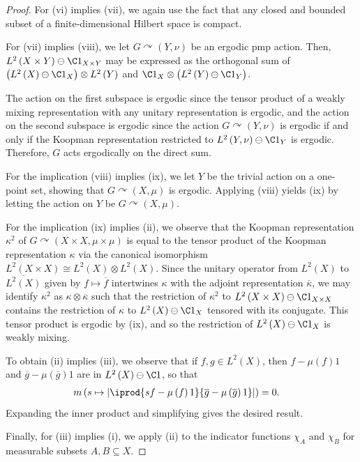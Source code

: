 \documentclass[10pt]{mypackage}
\begin{document}
\begin{proof}
  For (vi) implies (vii), we again use the fact that any closed and bounded subset of a finite-dimensional Hilbert space is compact.

  For (vii) implies (viii), we let $G\curvearrowright \left( Y,\nu \right)$ be an ergodic pmp action. Then, $L^2\left( X\times Y \right)\ominus \C 1_{X\times Y}$ may be expressed as the orthogonal sum of $\left( L^2\left( X \right)\ominus \C 1_X \right)\otimes L^2\left( Y \right)$ and $\C 1_X\otimes \left( L^2\left( Y \right)\ominus \C 1_Y \right)$.

  The action on the first subspace is ergodic since the tensor product of a weakly mixing representation with any unitary representation is ergodic, and the action on the second subspace is ergodic since the action $G\curvearrowright \left( Y,\nu \right)$ is ergodic if and only if the Koopman representation restricted to $L^2\left( Y,\nu \right)\ominus \C 1_Y$ is ergodic. Therefore, $G$ acts ergodically on the direct sum.

  For the implication (viii) implies (ix), we let $Y$ be the trivial action on a one-point set, showing that $G\curvearrowright \left( X,\mu \right) $ is ergodic. Applying (viii) yields (ix) by letting the action on $Y$ be $G\curvearrowright \left( X,\mu \right)$.

  For the implication (ix) implies (ii), we observe that the Koopman representation $\kappa^2$ of $G\curvearrowright \left( X\times X,\mu\times \mu \right)$ is equal to the tensor product of the Koopman representation $\kappa$ via the canonical isomorphism $L^2\left( X\times X \right) \cong L^2\left( X \right)\otimes L^2\left( X \right)$. Since the unitary operator from $L^2\left( X \right)$ to $ \overline{L^2\left( X \right)} $ given by $f\mapsto \overline{f}$ intertwines $\kappa$ with the adjoint representation $ \overline{\kappa} $, we may identify $\kappa^2$ as $\kappa\otimes \overline{\kappa}$ such that the restriction of $\kappa^2$ to $L^2\left( X\times X \right)\ominus \C 1_{X\times X}$ contains the restriction of $\kappa$ to $L^2\left( X \right)\ominus \C 1_{X}$ tensored with its conjugate. This tensor product is ergodic by (ix), and so the restriction of $L^2\left( X \right)\ominus \C 1_X$ is weakly mixing.

  To obtain (ii) implies (iii), we observe that if $f,g\in L^2\left( X \right)$, then $f- \mu(f)1$ and $ \overline{g} - \mu\left( \overline{g} \right)1 $ are in $L^2\left( X \right)\ominus \C 1$, so that
  \begin{align*}
    m\left( s\mapsto \left\vert \iprod{sf - \mu\left( f \right)1}{ \overline{g} - \mu\left( \overline{g} \right)1 } \right\vert \right) &= 0.
  \end{align*}
  Expanding the inner product and simplifying gives the desired result.

  Finally, for (iii) implies (i), we apply (ii) to the indicator functions $\chi_A$ and $\chi_B$ for measurable subsets $A,B\subseteq X$.
\end{proof}
\end{document}
